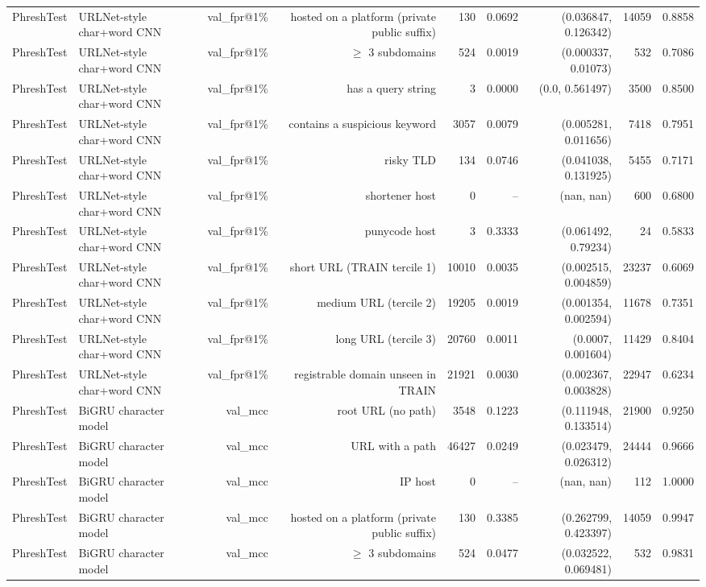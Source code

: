 \begin{table}[t]
\begin{tabular}{llrrrrrrr}
PhreshTest & URLNet-style char+word CNN & val\_fpr@1\% & hosted on a platform (private public suffix) & 130 & 0.0692 & (0.036847, 0.126342) & 14059 & 0.8858 \\
PhreshTest & URLNet-style char+word CNN & val\_fpr@1\% & $\geq$ 3 subdomains & 524 & 0.0019 & (0.000337, 0.01073) & 532 & 0.7086 \\
PhreshTest & URLNet-style char+word CNN & val\_fpr@1\% & has a query string & 3 & 0.0000 & (0.0, 0.561497) & 3500 & 0.8500 \\
PhreshTest & URLNet-style char+word CNN & val\_fpr@1\% & contains a suspicious keyword & 3057 & 0.0079 & (0.005281, 0.011656) & 7418 & 0.7951 \\
PhreshTest & URLNet-style char+word CNN & val\_fpr@1\% & risky TLD & 134 & 0.0746 & (0.041038, 0.131925) & 5455 & 0.7171 \\
PhreshTest & URLNet-style char+word CNN & val\_fpr@1\% & shortener host & 0 & -- & (nan, nan) & 600 & 0.6800 \\
PhreshTest & URLNet-style char+word CNN & val\_fpr@1\% & punycode host & 3 & 0.3333 & (0.061492, 0.79234) & 24 & 0.5833 \\
PhreshTest & URLNet-style char+word CNN & val\_fpr@1\% & short URL (TRAIN tercile 1) & 10010 & 0.0035 & (0.002515, 0.004859) & 23237 & 0.6069 \\
PhreshTest & URLNet-style char+word CNN & val\_fpr@1\% & medium URL (tercile 2) & 19205 & 0.0019 & (0.001354, 0.002594) & 11678 & 0.7351 \\
PhreshTest & URLNet-style char+word CNN & val\_fpr@1\% & long URL (tercile 3) & 20760 & 0.0011 & (0.0007, 0.001604) & 11429 & 0.8404 \\
PhreshTest & URLNet-style char+word CNN & val\_fpr@1\% & registrable domain unseen in TRAIN & 21921 & 0.0030 & (0.002367, 0.003828) & 22947 & 0.6234 \\
PhreshTest & BiGRU character model & val\_mcc & root URL (no path) & 3548 & 0.1223 & (0.111948, 0.133514) & 21900 & 0.9250 \\
PhreshTest & BiGRU character model & val\_mcc & URL with a path & 46427 & 0.0249 & (0.023479, 0.026312) & 24444 & 0.9666 \\
PhreshTest & BiGRU character model & val\_mcc & IP host & 0 & -- & (nan, nan) & 112 & 1.0000 \\
PhreshTest & BiGRU character model & val\_mcc & hosted on a platform (private public suffix) & 130 & 0.3385 & (0.262799, 0.423397) & 14059 & 0.9947 \\
PhreshTest & BiGRU character model & val\_mcc & $\geq$ 3 subdomains & 524 & 0.0477 & (0.032522, 0.069481) & 532 & 0.9831 \\

\end{tabular}
\end{table}
